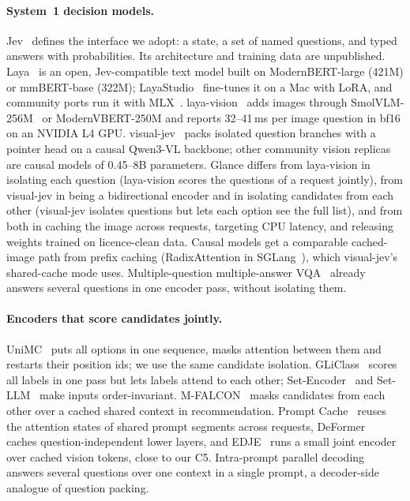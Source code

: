 \documentclass[10pt]{article}
\begin{document}
\paragraph{System~1 decision models.} Jev~\cite{jev2026,jevdocs} defines the interface we adopt: a state, a set of named questions, and typed answers with probabilities. Its architecture and training data are unpublished. Laya~\cite{laya2026} is an open, Jev-compatible text model built on ModernBERT-large (421M) or mmBERT-base (322M); LayaStudio~\cite{layastudio2026} fine-tunes it on a Mac with LoRA, and community ports run it with MLX~\cite{mlx2023,layamlx2026}. laya-vision~\cite{layavision2026} adds images through SmolVLM-256M~\cite{smolvlm} or ModernVBERT-250M and reports 32--41\,ms per image question in bf16 on an NVIDIA L4 GPU. visual-jev~\cite{visualjev2026} packs isolated question branches with a pointer head on a causal Qwen3-VL backbone; other community vision replicas are causal models of 0.45--8B parameters. Glance differs from laya-vision in isolating each question (laya-vision scores the questions of a request jointly), from visual-jev in being a bidirectional encoder and in isolating candidates from each other (visual-jev isolates questions but lets each option see the full list), and from both in caching the image across requests, targeting CPU latency, and releasing weights trained on licence-clean data. Causal models get a comparable cached-image path from prefix caching (RadixAttention in SGLang~\cite{sglang}), which visual-jev's shared-cache mode uses. Multiple-question multiple-answer VQA~\cite{mqma} already answers several questions in one encoder pass, without isolating them.
\paragraph{Encoders that score candidates jointly.} UniMC~\cite{unimc} puts all options in one sequence, masks attention between them and restarts their position ids; we use the same candidate isolation. GLiClass~\cite{gliclass} scores all labels in one pass but lets labels attend to each other; Set-Encoder~\cite{setencoder} and Set-LLM~\cite{setllm2025} make inputs order-invariant. M-FALCON~\cite{hstu2024} masks candidates from each other over a cached shared context in recommendation. Prompt Cache~\cite{promptcache} reuses the attention states of shared prompt segments across requests, DeFormer~\cite{deformer} caches question-independent lower layers, and EDJE~\cite{edje2025} runs a small joint encoder over cached vision tokens, close to our C5. Intra-prompt parallel decoding~\cite{ippd2026} answers several questions over one context in a single prompt, a decoder-side analogue of question packing.
\end{document}
